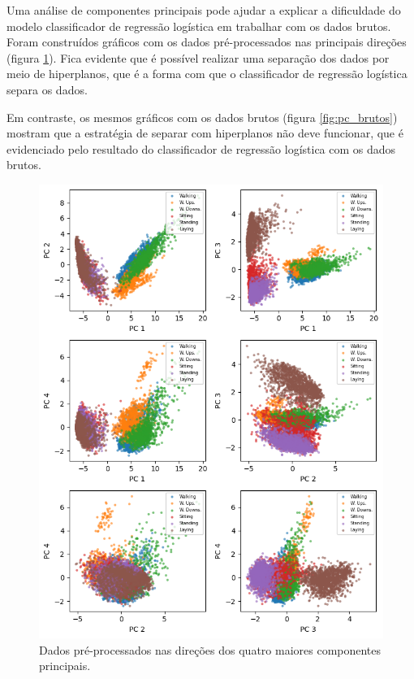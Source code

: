 \documentclass[final,5p]{elsarticle}
\numberwithin{equation}{section}
\begin{document}
        Uma análise de componentes principais pode ajudar a explicar a dificuldade do modelo classificador de regressão logística em trabalhar com os dados brutos. Foram construídos gráficos com os dados pré-processados nas principais direções (figura \ref{fig:pc_preprocessados}). Fica evidente que é possível realizar uma separação dos dados por meio de hiperplanos, que é a forma com que o classificador de regressão logística separa os dados.

        Em contraste, os mesmos gráficos com os dados brutos (figura \ref{fig:pc_brutos}) mostram que a estratégia de separar com hiperplanos não deve funcionar, que é evidenciado pelo resultado do classificador de regressão logística com os dados brutos.

        \begin{figure}[hbt!]
            \includegraphics[width=0.95\columnwidth]{C_PrincipalComponents.png}
            \caption{Dados pré-processados nas direções dos quatro maiores componentes principais.}
            \label{fig:pc_preprocessados}
        \end{figure}
\end{document}
